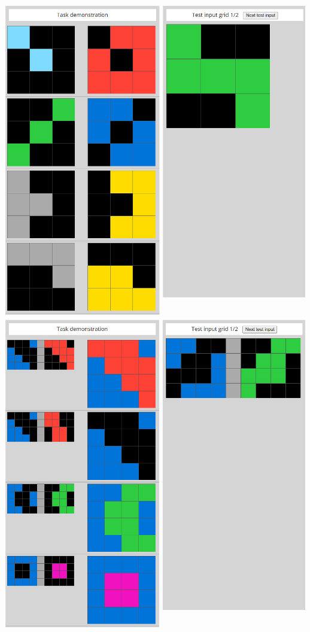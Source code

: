 \documentclass[letterpaper]{article} %
\begin{document}
\begin{center}
    \includegraphics[scale = 0.25]{solved_3.png}
    \vspace{\baselineskip}\vspace{\baselineskip}
    \includegraphics[scale = 0.25]{solved_4.png}
\end{center}
\end{document}
